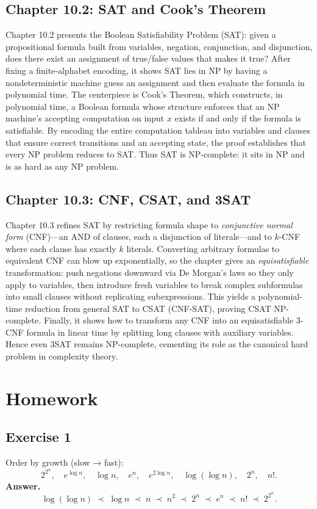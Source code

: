 \documentclass[12pt]{article}
\begin{document}
\subsection{Chapter 10.2: SAT and Cook’s Theorem}
Chapter 10.2 presents the Boolean Satisfiability Problem (SAT): given a propositional formula built from variables, negation, conjunction, and disjunction, does there exist an assignment of true/false values that makes it true?  After fixing a finite‐alphabet encoding, it shows SAT lies in NP by having a nondeterministic machine guess an assignment and then evaluate the formula in polynomial time.  The centerpiece is Cook’s Theorem, which constructs, in polynomial time, a Boolean formula whose structure enforces that an NP machine’s accepting computation on input $x$ exists if and only if the formula is satisfiable.  By encoding the entire computation tableau into variables and clauses that ensure correct transitions and an accepting state, the proof establishes that every NP problem reduces to SAT.  Thus SAT is NP-complete: it sits in NP and is as hard as any NP problem.

\subsection{Chapter 10.3: CNF, CSAT, and 3SAT}
Chapter 10.3 refines SAT by restricting formula shape to \emph{conjunctive normal form} (CNF)—an AND of clauses, each a disjunction of literals—and to $k$-CNF where each clause has exactly $k$ literals.  Converting arbitrary formulas to equivalent CNF can blow up exponentially, so the chapter gives an \emph{equisatisfiable} transformation: push negations downward via De Morgan’s laws so they only apply to variables, then introduce fresh variables to break complex subformulas into small clauses without replicating subexpressions.  This yields a polynomial-time reduction from general SAT to CSAT (CNF-SAT), proving CSAT NP-complete.  Finally, it shows how to transform any CNF into an equisatisfiable 3-CNF formula in linear time by splitting long clauses with auxiliary variables.  Hence even 3SAT remains NP-complete, cementing its role as the canonical hard problem in complexity theory.

\newpage

\section{Homework}

\subsection{Exercise 1}
Order by growth (slow → fast):
\[
2^{2^n},\quad e^{\log n},\quad \log n,\quad e^n,\quad
e^{2\log n},\quad \log(\log n),\quad 2^n,\quad n!.
\]
\textbf{Answer.}
\[
\log(\log n)\;\prec\;\log n\;\prec\;n\;\prec\;n^2\;\prec\;2^n\;\prec\;e^n\;\prec\;n!\;\prec\;2^{2^n}.
\]
\end{document}
